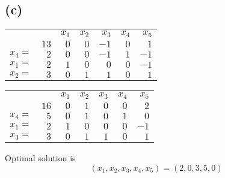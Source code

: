 \documentclass{article}
\theoremstyle{definition}
\begin{document}
\subsection*{(c)}
\bgroup
\def\arraystretch{1.5}
\begin{table}[H]
  \begin{tabular}{r|r|rrrrr|}
  \cline{2-7}
    &   & $x_1$ & $x_2$ & $x_3$ & $x_4$ & $x_5$ \\ \cline{2-7}
    & $13$ & $0$ & $0$ & $-1$ & $0$ & $1$ \\ \cline{2-7}
  $x_4 = $ & $2$ & $0$ & $0$ & $-1$ & $1$ & $-1$ \\ 
  $x_1 = $ & $2$ & $1$ & $0$ & $0$ & $0$ & $-1$ \\ 
  $x_2 = $ & $3$ & $0$ & $1$ & $1$ & $0$ & $1$ \\ \cline{2-7}
  \end{tabular}
\end{table}
\egroup
\bgroup
\def\arraystretch{1.5}
\begin{table}[H]
  \begin{tabular}{r|r|rrrrr|}
  \cline{2-7}
    &   & $x_1$ & $x_2$ & $x_3$ & $x_4$ & $x_5$ \\ \cline{2-7}
    & $16$ & $0$ & $1$ & $0$ & $0$ & $2$ \\ \cline{2-7}
  $x_4 = $ & $5$ & $0$ & $1$ & $0$ & $1$ & $0$ \\ 
  $x_1 = $ & $2$ & $1$ & $0$ & $0$ & $0$ & $-1$ \\ 
  $x_3 = $ & $3$ & $0$ & $1$ & $1$ & $0$ & $1$ \\ \cline{2-7}
  \end{tabular}
\end{table}
\egroup
Optimal solution is
\[
  (x_1, x_2, x_3, x_4, x_5) = (2, 0, 3, 5, 0)
\]
\end{document}
